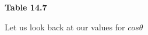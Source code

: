     \begin{center}{\small\bfseries Table 14.7}\end{center}
    \par
        \label{m39414*id86892}Let us look back at our values for $cos\theta $\par 
    \setlength\mytablespace{14\tabcolsep}
    \addtolength\mytablespace{8\arrayrulewidth}
    \setlength\mytablewidth{\linewidth}
    \setlength\mytableroom{\mytablewidth}
    \addtolength\mytableroom{-\mytablespace}
    \setlength\myfixedwidth{0pt}
    \setlength\mystarwidth{\mytableroom}
        \addtolength\mystarwidth{-\myfixedwidth}
        \divide{}
